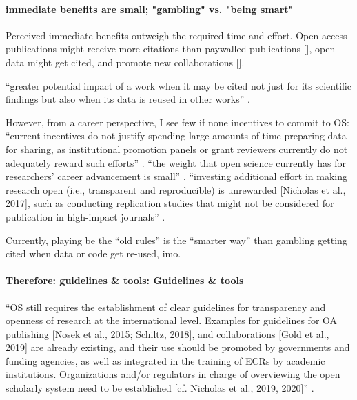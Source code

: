 \paragraph{immediate benefits are small; "gambling" vs. "being smart"}


Perceived immediate benefits outweigh the required time and effort.
%
Open access publications might receive more citations than paywalled
publications [\citep{piwowar2018state}], open data might
get cited, and promote new collaborations [\citep{popkin2019data}].


``greater potential impact of a work when it may be cited not just for its
scientific findings but also when its data is reused in other works''
\citep{nichols2017best}.

However, from a career perspective, I see few if none incentives to commit to
OS:
``current incentives do not justify spending large amounts of time preparing
data for sharing, as institutional promotion panels or grant reviewers currently
do not adequately reward such efforts'' \citep{nichols2017best}.
%
``the weight that open science currently has for researchers' career advancement
is small'' \citep{toribio2021early}.
%
``investing additional effort in making research open (i.e., transparent and
reproducible) is unrewarded [Nicholas et al., 2017], such as conducting
replication studies that might not be considered for publication in high-impact
journals'' \citep{toribio2021early}.

%
Currently, playing be the ``old rules'' is the ``smarter way'' than gambling
getting cited when data or code get re-used, imo.


\paragraph{Therefore: guidelines \& tools: Guidelines \& tools}


%
``OS still requires the establishment of clear guidelines for transparency and
openness of research at the international level.
%
Examples for guidelines for OA publishing [Nosek et al., 2015; Schiltz, 2018],
and collaborations [Gold et al., 2019] are already existing, and their use
should be promoted by governments and funding agencies, as well as integrated in
the training of ECRs by academic institutions.
%
Organizations and/or regulators in charge of overviewing the open scholarly
system need to be established [cf. Nicholas et al., 2019, 2020]''
\citep{toribio2021early}.


